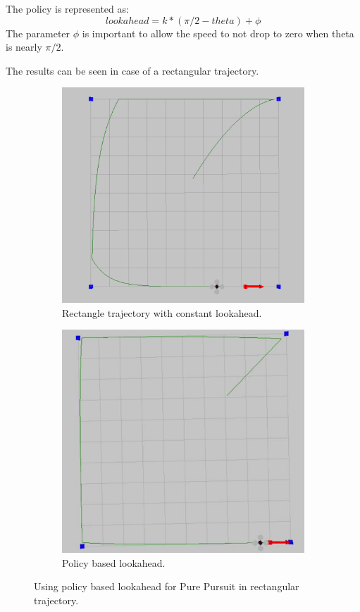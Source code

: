 \documentclass[hidelinks,BTech]{iitmdiss}
\begin{document}
The policy is represented as:
\begin{equation}
lookahead = k * (\pi/2-theta) + \phi
\end{equation}
The parameter $\phi$ is important to allow the speed to not drop to zero when theta is nearly $\pi/2$.

The results can be seen in case of a rectangular trajectory.
\begin{figure}[H]
  \centering
  \begin{subfigure}[t]{0.45\textwidth}
  \includegraphics[width=\textwidth]{Pure_Pursuit_rect.png}
      \caption{Rectangle trajectory with constant lookahead.}
  \end{subfigure}
  \begin{subfigure}[t]{0.43\textwidth}
      \includegraphics[width=\textwidth]{1.png}
      \caption{Policy based lookahead.}
  \end{subfigure}
    \caption{Using policy based lookahead for Pure Pursuit in rectangular trajectory.}
\end{figure}
\end{document}
